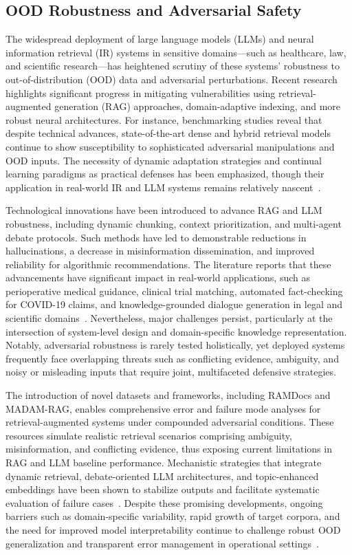 \documentclass[sigconf]{acmart}
\begin{document}
\subsection{OOD Robustness and Adversarial Safety}

The widespread deployment of large language models (LLMs) and neural information retrieval (IR) systems in sensitive domains—such as healthcare, law, and scientific research—has heightened scrutiny of these systems’ robustness to out-of-distribution (OOD) data and adversarial perturbations. Recent research highlights significant progress in mitigating vulnerabilities using retrieval-augmented generation (RAG) approaches, domain-adaptive indexing, and more robust neural architectures. For instance, benchmarking studies reveal that despite technical advances, state-of-the-art dense and hybrid retrieval models continue to show susceptibility to sophisticated adversarial manipulations and OOD inputs. The necessity of dynamic adaptation strategies and continual learning paradigms as practical defenses has been emphasized, though their application in real-world IR and LLM systems remains relatively nascent~\cite{ref7,ref26}.

Technological innovations have been introduced to advance RAG and LLM robustness, including dynamic chunking, context prioritization, and multi-agent debate protocols. Such methods have led to demonstrable reductions in hallucinations, a decrease in misinformation dissemination, and improved reliability for algorithmic recommendations. The literature reports that these advancements have significant impact in real-world applications, such as perioperative medical guidance, clinical trial matching, automated fact-checking for COVID-19 claims, and knowledge-grounded dialogue generation in legal and scientific domains~\cite{ref9,ref10,ref20,ref25,ref36,ref37,ref49,ref52,ref53,ref54,ref61,ref62,ref63,ref64}. Nevertheless, major challenges persist, particularly at the intersection of system-level design and domain-specific knowledge representation. Notably, adversarial robustness is rarely tested holistically, yet deployed systems frequently face overlapping threats such as conflicting evidence, ambiguity, and noisy or misleading inputs that require joint, multifaceted defensive strategies.

The introduction of novel datasets and frameworks, including RAMDocs and MADAM-RAG, enables comprehensive error and failure mode analyses for retrieval-augmented systems under compounded adversarial conditions. These resources simulate realistic retrieval scenarios comprising ambiguity, misinformation, and conflicting evidence, thus exposing current limitations in RAG and LLM baseline performance. Mechanistic strategies that integrate dynamic retrieval, debate-oriented LLM architectures, and topic-enhanced embeddings have been shown to stabilize outputs and facilitate systematic evaluation of failure cases~\cite{ref9,ref62,ref63,ref64}. Despite these promising developments, ongoing barriers such as domain-specific variability, rapid growth of target corpora, and the need for improved model interpretability continue to challenge robust OOD generalization and transparent error management in operational settings~\cite{ref53,ref54}.
\end{document}

